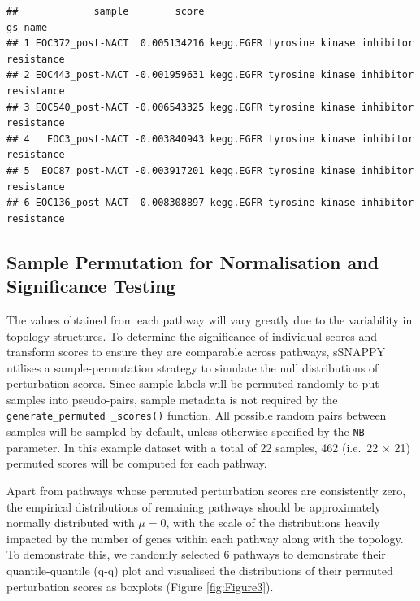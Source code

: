 \documentclass[9pt,a4paper,]{extarticle}
\newenvironment{Shaded}{\begin{snugshade}}{\end{snugshade}}
\newcommand{\AttributeTok}[1]{\textcolor[rgb]{0.13,0.29,0.53}{#1}}
\newcommand{\DecValTok}[1]{\textcolor[rgb]{0.00,0.00,0.81}{#1}}
\newcommand{\FunctionTok}[1]{\textcolor[rgb]{0.13,0.29,0.53}{\textbf{#1}}}
\newcommand{\NormalTok}[1]{#1}
\newcommand{\OtherTok}[1]{\textcolor[rgb]{0.56,0.35,0.01}{#1}}
\newcommand{\SpecialCharTok}[1]{\textcolor[rgb]{0.81,0.36,0.00}{\textbf{#1}}}
\begin{document}
\begin{verbatim}
##             sample        score                                        gs_name
## 1 EOC372_post-NACT  0.005134216 kegg.EGFR tyrosine kinase inhibitor resistance
## 2 EOC443_post-NACT -0.001959631 kegg.EGFR tyrosine kinase inhibitor resistance
## 3 EOC540_post-NACT -0.006543325 kegg.EGFR tyrosine kinase inhibitor resistance
## 4   EOC3_post-NACT -0.003840943 kegg.EGFR tyrosine kinase inhibitor resistance
## 5  EOC87_post-NACT -0.003917201 kegg.EGFR tyrosine kinase inhibitor resistance
## 6 EOC136_post-NACT -0.008308897 kegg.EGFR tyrosine kinase inhibitor resistance
\end{verbatim}

\hypertarget{sample-permutation-for-normalisation-and-significance-testing}{%
\subsection{Sample Permutation for Normalisation and Significance Testing}\label{sample-permutation-for-normalisation-and-significance-testing}}

The values obtained from each pathway will vary greatly due to the variability in topology structures.
To determine the significance of individual scores and transform scores to ensure they are comparable across pathways, sSNAPPY utilises a sample-permutation strategy to simulate the null distributions of perturbation scores.
Since sample labels will be permuted randomly to put samples into pseudo-pairs, sample metadata is not required by the \texttt{generate\_permuted\ \_scores()} function.
All possible random pairs between samples will be sampled by default, unless otherwise specified by the \texttt{NB} parameter.
In this example dataset with a total of 22 samples, 462 (i.e.~22 \(\times\) 21) permuted scores will be computed for each pathway.

\begin{Shaded}
\end{Shaded}

Apart from pathways whose permuted perturbation scores are consistently zero, the empirical distributions of remaining pathways should be approximately normally distributed with \(\mu = 0\), with the scale of the distributions heavily impacted by the number of genes within each pathway along with the topology.
To demonstrate this, we randomly selected 6 pathways to demonstrate their quantile-quantile (q-q) plot and visualised the distributions of their permuted perturbation scores as boxplots (Figure \ref{fig:Figure3}).
\end{document}
